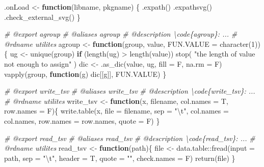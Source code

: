 \documentclass[
]{article}
\newenvironment{Shaded}{\begin{snugshade}}{\end{snugshade}}
\newcommand{\AttributeTok}[1]{\textcolor[rgb]{0.77,0.63,0.00}{#1}}
\newcommand{\CommentTok}[1]{\textcolor[rgb]{0.56,0.35,0.01}{\textit{#1}}}
\newcommand{\ControlFlowTok}[1]{\textcolor[rgb]{0.13,0.29,0.53}{\textbf{#1}}}
\newcommand{\DecValTok}[1]{\textcolor[rgb]{0.00,0.00,0.81}{#1}}
\newcommand{\FunctionTok}[1]{\textcolor[rgb]{0.00,0.00,0.00}{#1}}
\newcommand{\NormalTok}[1]{#1}
\newcommand{\OtherTok}[1]{\textcolor[rgb]{0.56,0.35,0.01}{#1}}
\newcommand{\SpecialCharTok}[1]{\textcolor[rgb]{0.00,0.00,0.00}{#1}}
\newcommand{\StringTok}[1]{\textcolor[rgb]{0.31,0.60,0.02}{#1}}
\begin{document}
\begin{Shaded}
\begin{Highlighting}[]
\NormalTok{.onLoad }\OtherTok{\textless{}{-}} \ControlFlowTok{function}\NormalTok{(libname, pkgname) \{}
  \FunctionTok{.expath}\NormalTok{()}
  \FunctionTok{.expathsvg}\NormalTok{()}
  \FunctionTok{.check\_external\_svg}\NormalTok{()}
\NormalTok{\}}

\CommentTok{\#\textquotesingle{} @export agroup}
\CommentTok{\#\textquotesingle{} @aliases agroup}
\CommentTok{\#\textquotesingle{} @description \textbackslash{}code\{agroup\}: ...}
\CommentTok{\#\textquotesingle{} @rdname utilites}
\NormalTok{agroup }\OtherTok{\textless{}{-}} \ControlFlowTok{function}\NormalTok{(group, value, }\AttributeTok{FUN.VALUE =} \FunctionTok{character}\NormalTok{(}\DecValTok{1}\NormalTok{)) \{}
\NormalTok{  ug }\OtherTok{\textless{}{-}} \FunctionTok{unique}\NormalTok{(group)}
  \ControlFlowTok{if}\NormalTok{ (}\FunctionTok{length}\NormalTok{(ug) }\SpecialCharTok{\textgreater{}} \FunctionTok{length}\NormalTok{(value))}
    \FunctionTok{stop}\NormalTok{( }\StringTok{"the length of \textquotesingle{}value\textquotesingle{} not enough to assign"}\NormalTok{ )}
\NormalTok{  dic }\OtherTok{\textless{}{-}} \FunctionTok{.as\_dic}\NormalTok{(value, ug, }\AttributeTok{fill =}\NormalTok{ F, }\AttributeTok{na.rm =}\NormalTok{ F)}
  \FunctionTok{vapply}\NormalTok{(group, }\ControlFlowTok{function}\NormalTok{(g) dic[[g]], FUN.VALUE)}
\NormalTok{\}}

\CommentTok{\#\textquotesingle{} @export write\_tsv}
\CommentTok{\#\textquotesingle{} @aliases write\_tsv}
\CommentTok{\#\textquotesingle{} @description \textbackslash{}code\{write\_tsv\}: ...}
\CommentTok{\#\textquotesingle{} @rdname utilites}
\NormalTok{write\_tsv }\OtherTok{\textless{}{-}}
  \ControlFlowTok{function}\NormalTok{(x, filename, }\AttributeTok{col.names =}\NormalTok{ T, }\AttributeTok{row.names =}\NormalTok{ F)\{}
    \FunctionTok{write.table}\NormalTok{(x, }\AttributeTok{file =}\NormalTok{ filename, }\AttributeTok{sep =} \StringTok{"}\SpecialCharTok{\textbackslash{}t}\StringTok{"}\NormalTok{,}
      \AttributeTok{col.names =}\NormalTok{ col.names, }\AttributeTok{row.names =}\NormalTok{ row.names, }\AttributeTok{quote =}\NormalTok{ F)}
\NormalTok{  \}}

\CommentTok{\#\textquotesingle{} @export read\_tsv}
\CommentTok{\#\textquotesingle{} @aliases read\_tsv}
\CommentTok{\#\textquotesingle{} @description \textbackslash{}code\{read\_tsv\}: ...}
\CommentTok{\#\textquotesingle{} @rdname utilites}
\NormalTok{read\_tsv }\OtherTok{\textless{}{-}} \ControlFlowTok{function}\NormalTok{(path)\{}
\NormalTok{  file }\OtherTok{\textless{}{-}}\NormalTok{ data.table}\SpecialCharTok{::}\FunctionTok{fread}\NormalTok{(}\AttributeTok{input =}\NormalTok{ path, }\AttributeTok{sep =} \StringTok{"}\SpecialCharTok{\textbackslash{}t}\StringTok{"}\NormalTok{,}
    \AttributeTok{header =}\NormalTok{ T, }\AttributeTok{quote =} \StringTok{""}\NormalTok{, }\AttributeTok{check.names =}\NormalTok{ F)}
  \FunctionTok{return}\NormalTok{(file)}
\NormalTok{\}}


\end{Highlighting}
\end{Shaded}
\end{document}
